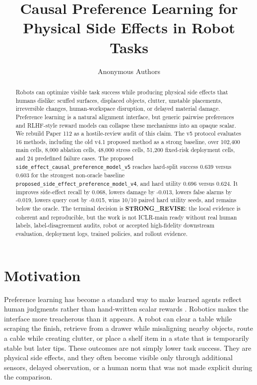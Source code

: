 \documentclass{article}
\title{Causal Preference Learning for Physical Side Effects in Robot Tasks}
\author{Anonymous Authors}
\begin{document}
\maketitle

\begin{abstract}
Robots can optimize visible task success while producing physical side effects that humans dislike: scuffed surfaces, displaced objects, clutter, unstable placements, irreversible changes, human-workspace disruption, or delayed material damage. Preference learning is a natural alignment interface, but generic pairwise preferences and RLHF-style reward models can collapse these mechanisms into an opaque scalar. We rebuild Paper 112 as a hostile-review audit of this claim. The v5 protocol evaluates 16 methods, including the old v4.1 proposed method as a strong baseline, over 102,400 main cells, 8,000 ablation cells, 48,000 stress cells, 51,200 fixed-risk deployment cells, and 24 predefined failure cases. The proposed \texttt{side\_effect\_causal\_preference\_model\_v5} reaches hard-split success 0.639 versus 0.603 for the strongest non-oracle baseline \texttt{proposed\_side\_effect\_preference\_model\_v4}, and hard utility 0.696 versus 0.624. It improves side-effect recall by 0.068, lowers damage by -0.013, lowers false alarms by -0.019, lowers query cost by -0.015, wins 10/10 paired hard utility seeds, and remains below the oracle. The terminal decision is \textbf{STRONG\_REVISE}: the local evidence is coherent and reproducible, but the work is not ICLR-main ready without real human labels, label-disagreement audits, robot or accepted high-fidelity downstream evaluation, deployment logs, trained policies, and rollout evidence.
\end{abstract}

\section{Motivation}
Preference learning has become a standard way to make learned agents reflect human judgments rather than hand-written scalar rewards \citep{christiano2017deep,wirth2017survey,sadigh2017active,wilson2012bayesian}. Robotics makes the interface more treacherous than it appears. A robot can clear a table while scraping the finish, retrieve from a drawer while misaligning nearby objects, route a cable while creating clutter, or place a shelf item in a state that is temporarily stable but later tips. These outcomes are not simply lower task success. They are physical side effects, and they often become visible only through additional sensors, delayed observation, or a human norm that was not made explicit during the comparison.
\end{document}
